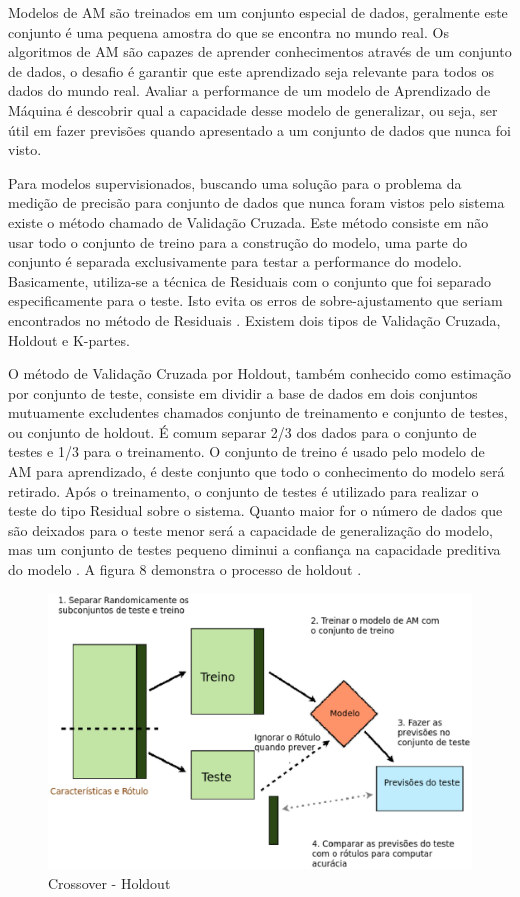Modelos de AM são treinados em um conjunto especial de dados, geralmente este conjunto é uma pequena amostra do que se encontra no mundo real. Os algoritmos de AM são capazes de aprender conhecimentos através de um conjunto de dados, o desafio é garantir que este aprendizado seja relevante para todos os dados do mundo real. Avaliar a performance de um modelo de Aprendizado de Máquina é descobrir qual a capacidade desse modelo de generalizar, ou seja, ser útil em fazer previsões quando apresentado a um conjunto de dados que nunca foi visto.

Para modelos supervisionados, buscando uma solução para o problema da medição de precisão para conjunto de dados que nunca foram vistos pelo sistema existe o método chamado de Validação Cruzada. Este método consiste em não usar todo o conjunto de treino para a construção do modelo, uma parte do conjunto é separada exclusivamente para testar a performance do modelo. Basicamente, utiliza-se a técnica de Residuais com o conjunto que foi separado especificamente para o teste. Isto evita os erros de sobre-ajustamento que seriam encontrados no método de Residuais \cite{jeff1997b}. Existem dois tipos de Validação Cruzada, Holdout e K-partes. 

O método de Validação Cruzada por Holdout, também conhecido como estimação por conjunto de teste, consiste em dividir a base de dados em dois conjuntos mutuamente excludentes chamados conjunto de treinamento e conjunto de testes, ou conjunto de holdout. É comum separar 2/3 dos dados para o conjunto de testes e 1/3 para o treinamento. O conjunto de treino é usado pelo modelo de AM para aprendizado, é deste conjunto que todo o conhecimento do modelo será retirado. Após o treinamento, o conjunto de testes é utilizado para realizar o teste do tipo Residual sobre o sistema. Quanto maior for o número de dados que são deixados para o teste menor será a capacidade de generalização do modelo, mas um conjunto de testes pequeno diminui a confiança na capacidade preditiva do modelo \cite{astudy1995}. A figura 8 demonstra o processo de holdout \cite{real2013}.

\begin{figure}[!h]
\centering
\includegraphics[keepaspectratio=true,scale=0.70]
{figuras/holdout.eps}
\caption{Crossover - Holdout}
\label{over}
\end{figure}

